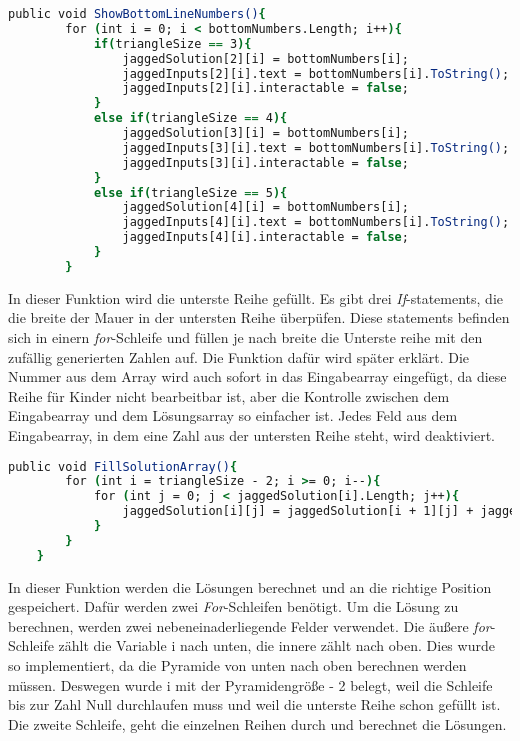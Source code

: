 \begin{lstlisting}[language=csh, caption={Triangle.cs ShowBottomLineNumbers-Funktion}]
	public void ShowBottomLineNumbers(){
		for (int i = 0; i < bottomNumbers.Length; i++){
			if(triangleSize == 3){
				jaggedSolution[2][i] = bottomNumbers[i];
				jaggedInputs[2][i].text = bottomNumbers[i].ToString();
				jaggedInputs[2][i].interactable = false;
			}
			else if(triangleSize == 4){
				jaggedSolution[3][i] = bottomNumbers[i];
				jaggedInputs[3][i].text = bottomNumbers[i].ToString();
				jaggedInputs[3][i].interactable = false;
			}
			else if(triangleSize == 5){
				jaggedSolution[4][i] = bottomNumbers[i];
				jaggedInputs[4][i].text = bottomNumbers[i].ToString();
				jaggedInputs[4][i].interactable = false;
			}
		}
\end{lstlisting}
In dieser Funktion wird die unterste Reihe gefüllt. Es gibt drei \textit{If}-statements, die die breite der Mauer in der untersten Reihe überpüfen. Diese statements befinden sich in einern \textit{for}-Schleife und füllen je nach breite die Unterste reihe mit den zufällig generierten Zahlen auf. Die Funktion dafür wird später erklärt. Die Nummer aus dem Array wird auch sofort in das Eingabearray eingefügt, da diese Reihe für Kinder nicht bearbeitbar ist, aber die Kontrolle zwischen dem Eingabearray und dem Lösungsarray so einfacher ist. Jedes Feld aus dem Eingabearray, in dem eine Zahl aus der untersten Reihe steht, wird deaktiviert.\\
\begin{lstlisting}[language=csh, caption={Triangle.cs FillSolutionArray-Funktion}]
	public void FillSolutionArray(){
		for (int i = triangleSize - 2; i >= 0; i--){
			for (int j = 0; j < jaggedSolution[i].Length; j++){
				jaggedSolution[i][j] = jaggedSolution[i + 1][j] + jaggedSolution[i + 1][j + 1];
			}
		}
	}
\end{lstlisting}
In dieser Funktion werden die Lösungen berechnet und an die richtige Position gespeichert. Dafür werden zwei \textit{For}-Schleifen benötigt. Um die Lösung zu berechnen, werden zwei nebeneinaderliegende Felder verwendet. Die äußere \textit{for}-Schleife zählt die Variable i nach unten, die innere zählt nach oben. Dies wurde so implementiert, da die Pyramide von unten nach oben berechnen werden müssen. Deswegen wurde i mit der Pyramidengröße - 2 belegt, weil die Schleife bis zur Zahl Null durchlaufen muss und weil die unterste Reihe schon gefüllt ist. Die zweite Schleife, geht die einzelnen Reihen durch und berechnet die Lösungen.\\
